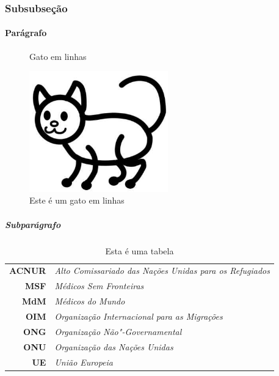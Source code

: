 \documentclass{memoir}
\begin{document}
\subsubsection{Subsubseção}
\lipsum[3]

\paragraph{Parágrafo}
\lipsum[4]

\begin{figure}[t]
\caption{Gato em linhas}
\includegraphics[width=6cm]{cat.jpg}
\caption{Este é um gato em linhas}
\end{figure}

\subparagraph{Subparágrafo}
\lipsum[5]


\begin{table}[b]
\centering
\caption{Esta é uma tabela}
\label{my-label}
\begin{tabular}{rl}
\rowcolor[HTML]{ECF4FF} 
\textbf{ACNUR} & \textit{Alto Comissariado das Nações Unidas para os Refugiados} \\
\textbf{MSF}   & \textit{Médicos Sem Fronteiras}                                 \\
\rowcolor[HTML]{ECF4FF} 
\textbf{MdM}   & \textit{Médicos do Mundo}                                       \\
\textbf{OIM}   & \textit{Organização Internacional para as Migrações}            \\
\rowcolor[HTML]{ECF4FF} 
\textbf{ONG}   & \textit{Organização Não"-Governamental}                         \\
\textbf{ONU}   & \textit{Organização das Nações Unidas}                          \\
\rowcolor[HTML]{ECF4FF} 
\textbf{UE}    & \textit{União Europeia}                                        
\end{tabular}
\end{table}


\lipsum


 
\end{document}
